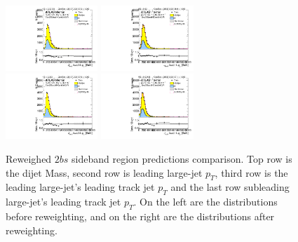 \begin{figure}[htbp!]
\begin{center}
\includegraphics[width=0.31\textwidth,angle=-90]{figures/boosted/Prereweight/Moriond_TwoTag_split_Sideband_leadHCand_trk0_Pt.pdf}
\includegraphics[width=0.31\textwidth,angle=-90]{figures/boosted/Sideband/b77_TwoTag_split_Sideband_leadHCand_trk0_Pt.pdf}\\
\includegraphics[width=0.31\textwidth,angle=-90]{figures/boosted/Prereweight/Moriond_TwoTag_split_Sideband_sublHCand_trk0_Pt.pdf}
\includegraphics[width=0.31\textwidth,angle=-90]{figures/boosted/Sideband/b77_TwoTag_split_Sideband_sublHCand_trk0_Pt.pdf}\\
\caption{Reweighed $2bs$ sideband region predictions comparison. Top row is the dijet Mass, second row is leading large-\R jet $p_{T}$, third row is the leading large-\R jet's leading track jet $p_T$ and the last row subleading large-\R jet's leading track jet $p_T$. On the left are the distributions before reweighting, and on the right are the distributions after reweighting.}
\label{fig:rw-2bs-comp-sb}
\end{center}
\end{figure}



